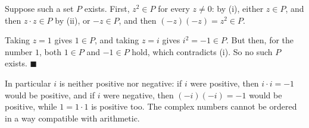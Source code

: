 Suppose such a set $P$ exists. First, $z^2\in P$ for every $z\ne0$: by (i), either $z\in P$, and then $z\cdot z\in P$ by (ii), or $-z\in P$, and then $(-z)(-z)=z^2\in P$.

Taking $z=1$ gives $1\in P$, and taking $z=i$ gives $i^2=-1\in P$. But then, for the number $1$, both $1\in P$ and $-1\in P$ hold, which contradicts (i). So no such $P$ exists. $\blacksquare$

In particular $i$ is neither positive nor negative: if $i$ were positive, then $i\cdot i=-1$ would be positive, and if $i$ were negative, then $(-i)(-i)=-1$ would be positive, while $1=1\cdot1$ is positive too. The complex numbers cannot be ordered in a way compatible with arithmetic.
